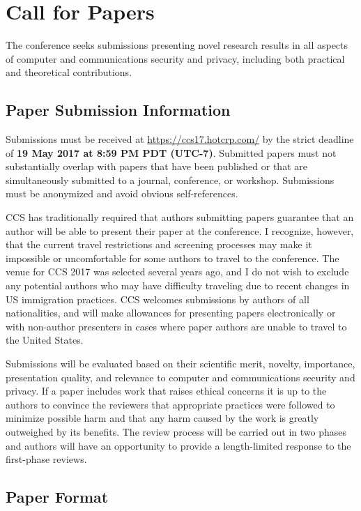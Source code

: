 \section{Call for Papers}

The conference seeks submissions presenting novel research results in
all aspects of computer and communications security and privacy,
including both practical and theoretical contributions.

\subsection{Paper Submission Information}

Submissions must be received at \url{https://ccs17.hotcrp.com/} by the
strict deadline of {\bf 19 May 2017 at 8:59 PM PDT (UTC-7)}.
Submitted papers must not substantially overlap with papers that have
been published or that are simultaneously submitted to a journal,
conference, or workshop. Submissions must be anonymized and avoid
obvious self-references.

CCS has traditionally required that authors submitting papers
guarantee that an author will be able to present their paper at the
conference. I recognize, however, that the current travel
restrictions and screening processes may make it impossible or
uncomfortable for some authors to travel to the conference. The venue
for CCS 2017 was selected several years ago, and I do not wish to
exclude any potential authors who may have difficulty traveling due to
recent changes in US immigration practices.  CCS welcomes submissions
by authors of all nationalities, and will make allowances for
presenting papers electronically or with non-author presenters in
cases where paper authors are unable to travel to the United States.

Submissions will be evaluated based on their scientific merit,
novelty, importance, presentation quality, and relevance to computer
and communications security and privacy.  If a paper includes work
that raises ethical concerns it is up to the authors to convince the
reviewers that appropriate practices were followed to minimize
possible harm and that any harm caused by the work is greatly
outweighed by its benefits. The review process will be carried out in
two phases and authors will have an opportunity to provide a
length-limited response to the first-phase reviews.

\subsection{Paper Format}

